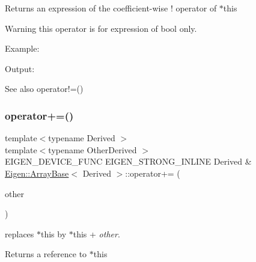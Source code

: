 \begin{DoxyReturn}{Returns}
an expression of the coefficient-\/wise ! operator of $\ast$this
\end{DoxyReturn}
\begin{DoxyWarning}{Warning}
this operator is for expression of bool only.
\end{DoxyWarning}
Example\+: 
\begin{DoxyCodeInclude}{0}
\end{DoxyCodeInclude}
 Output\+: 
\begin{DoxyVerbInclude}
\end{DoxyVerbInclude}


\begin{DoxySeeAlso}{See also}
operator!=() 
\end{DoxySeeAlso}
\mbox{\label{class_eigen_1_1_array_base_ab4bac4291bfd0da16f768d32398e7752}} 
\subsubsection{\texorpdfstring{operator+=()}{operator+=()}}
{\footnotesize\ttfamily template$<$typename Derived $>$ \\
template$<$typename Other\+Derived $>$ \\
E\+I\+G\+E\+N\+\_\+\+D\+E\+V\+I\+C\+E\+\_\+\+F\+U\+NC E\+I\+G\+E\+N\+\_\+\+S\+T\+R\+O\+N\+G\+\_\+\+I\+N\+L\+I\+NE Derived \& \mbox{\hyperlink{class_eigen_1_1_array_base}{Eigen\+::\+Array\+Base}}$<$ Derived $>$\+::operator+= (\begin{DoxyParamCaption}\item[{const \mbox{\hyperlink{class_eigen_1_1_array_base}{Array\+Base}}$<$ Other\+Derived $>$ \&}]{other }\end{DoxyParamCaption})}

replaces {\ttfamily $\ast$this} by {\ttfamily $\ast$this} + {\itshape other}.

\begin{DoxyReturn}{Returns}
a reference to {\ttfamily $\ast$this} 
\end{DoxyReturn}
\mbox{\label{class_eigen_1_1_array_base_ae04203c232cffc00218bb9cd71396ed6}} 
